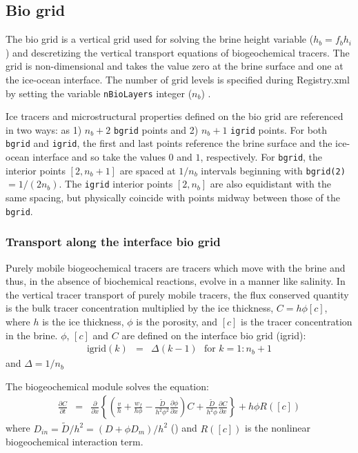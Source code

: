 \subsection{Bio grid}
\label{sec:bio_grid}
The bio grid  is a vertical grid used for solving the brine height
variable ($h_b = f_b h_i$) and descretizing the vertical transport equations of
biogeochemical tracers. The grid is non-dimensional and takes the value zero at the brine surface and one at the ice-ocean
interface.  The number of grid levels is specified during Registry.xml  by setting the variable {\tt nBioLayers}
integer ($n_b$) .

Ice tracers and microstructural properties defined on the bio grid are
 referenced in two ways: as
1)  $n_b+2$ {\tt bgrid} points  and 2) $n_b+1$ {\tt igrid} points.
For both  {\tt bgrid} and {\tt igrid}, the first and last points reference
the brine surface and the ice-ocean interface and so take the values $0$ and $1$,
respectively.  For  {\tt bgrid}, the interior points $[2, n_b+1]$ are
spaced at $1/n_b$ intervals beginning with {\tt bgrid(2)}$ =
1/(2n_b)$.  The {\tt igrid} interior points $[2, n_b]$ are also
equidistant with the same spacing, but physically coincide  with
points midway between those of the {\tt bgrid}.

 \subsubsection{Transport along the interface bio grid}

Purely mobile biogeochemical tracers are tracers which move with the brine and thus,
in the absence of biochemical reactions, evolve in a manner like salinity.  In the vertical tracer transport of purely mobile tracers, the flux conserved quantity is the bulk
tracer concentration multiplied by the ice thickness, \bgcie $C = h\phi
[c]$, where $h$ is the ice thickness, $\phi$ is the porosity, and
$[c]$ is the tracer concentration in the brine.  $\phi$, $[c]$ and $C$  are defined on the interface bio grid (igrid):
\begin{eqnarray}
\mbox{igrid}(k) & =  & \Delta (k-1) \ \ \ \mbox{for }k = 1:n_b+1
\end{eqnarray}
and $\Delta = 1/n_b$

The biogeochemical module solves the equation:
\begin{eqnarray}
\frac{\partial C}{\partial t} & =& \frac{\partial }{\partial x}\left\{
\left( \frac{v}{h} + \frac{w_f}{h\phi} -
  \frac{\tilde{D}}{h^2\phi^2}\frac{\partial \phi}{\partial x} \right) C
+ \frac{\tilde{D}}{h^2\phi}\frac{\partial C}{\partial x}
\right\} + h\phi R([c]) \label{eqn:mobile_transport}
\end{eqnarray}
where $D_{in} = \tilde{D}/h^2 =  (D + \phi D_m)/h^2$ (\cite{Jeffery:tracers:2011})
and $R([c])$ is
the nonlinear biogeochemical interaction term.

